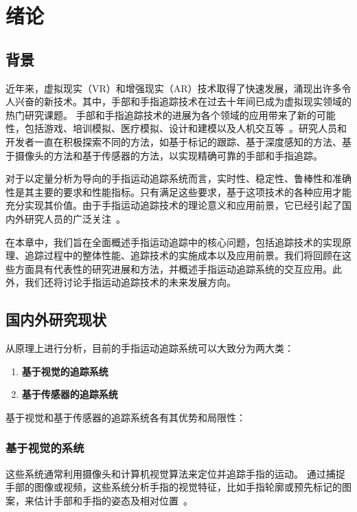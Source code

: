 \cleardoublepage

\section{绪论}

\subsection{背景}

近年来，虚拟现实（VR）和增强现实（AR）技术取得了快速发展，涌现出许多令人兴奋的新技术。其中，手部和手指追踪技术在过去十年间已成为虚拟现实领域的热门研究课题。
手部和手指追踪技术的进展为各个领域的应用带来了新的可能性，包括游戏、培训模拟、医疗模拟、设计和建模以及人机交互等~\cite{introArticle1}。研究人员和开发者一直在积极探索不同的方法，如基于标记的跟踪、基于深度感知的方法、基于摄像头的方法和基于传感器的方法，以实现精确可靠的手部和手指追踪。

对于以定量分析为导向的手指运动追踪系统而言，实时性、稳定性、鲁棒性和准确性是其主要的要求和性能指标。只有满足这些要求，基于这项技术的各种应用才能充分实现其价值。由于手指运动追踪技术的理论意义和应用前景，它已经引起了国内外研究人员的广泛关注~\cite{introArticle4}。

在本章中，我们旨在全面概述手指运动追踪中的核心问题，包括追踪技术的实现原理、追踪过程中的整体性能、追踪技术的实施成本以及应用前景。我们将回顾在这些方面具有代表性的研究进展和方法，并概述手指运动追踪系统的交互应用。此外，我们还将讨论手指运动追踪技术的未来发展方向。

\subsection{国内外研究现状}

从原理上进行分析，目前的手指运动追踪系统可以大致分为两大类：
\begin{enumerate}
    \item {\bfseries 基于视觉的追踪系统}
    \item {\bfseries 基于传感器的追踪系统}
\end{enumerate}

基于视觉和基于传感器的追踪系统各有其优势和局限性：
\subsubsection{基于视觉的系统}

这些系统通常利用摄像头和计算机视觉算法来定位并追踪手指的运动。
通过捕捉手部的图像或视频，这些系统分析手指的视觉特征，比如手指轮廓或预先标记的图案，来估计手部和手指的姿态及相对位置~\cite{introArticle2}。

